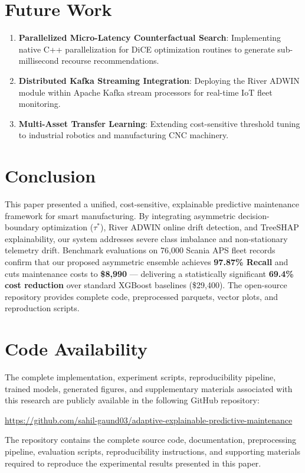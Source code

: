 \documentclass[conference]{IEEEtran}
\begin{document}
\section{Future Work}
\begin{enumerate}
    \item \textbf{Parallelized Micro-Latency Counterfactual Search}: Implementing native C++ parallelization for DiCE optimization routines to generate sub-millisecond recourse recommendations.
    \item \textbf{Distributed Kafka Streaming Integration}: Deploying the River ADWIN module within Apache Kafka stream processors for real-time IoT fleet monitoring.
    \item \textbf{Multi-Asset Transfer Learning}: Extending cost-sensitive threshold tuning to industrial robotics and manufacturing CNC machinery.
\end{enumerate}

\section{Conclusion}
This paper presented a unified, cost-sensitive, explainable predictive maintenance framework for smart manufacturing. By integrating asymmetric decision-boundary optimization ($\tau^*$), River ADWIN online drift detection, and TreeSHAP explainability, our system addresses severe class imbalance and non-stationary telemetry drift. Benchmark evaluations on 76,000 Scania APS fleet records confirm that our proposed asymmetric ensemble achieves \textbf{97.87\% Recall} and cuts maintenance costs to \textbf{\$8,990} --- delivering a statistically significant \textbf{69.4\% cost reduction} over standard XGBoost baselines (\$29,400). The open-source repository provides complete code, preprocessed parquets, vector plots, and reproduction scripts.

\section*{Code Availability}
The complete implementation, experiment scripts, reproducibility pipeline, trained models, generated figures, and supplementary materials associated with this research are publicly available in the following GitHub repository:

\url{https://github.com/sahil-gaund03/adaptive-explainable-predictive-maintenance}

The repository contains the complete source code, documentation, preprocessing pipeline, evaluation scripts, reproducibility instructions, and supporting materials required to reproduce the experimental results presented in this paper.



\end{document}
